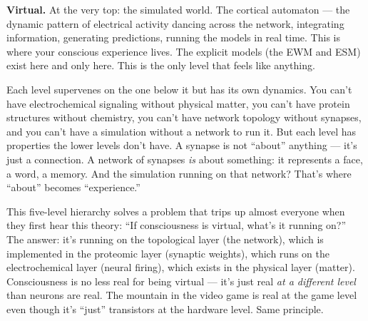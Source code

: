 \documentclass[11pt, twoside, openright]{book}
\begin{document}
\textbf{Virtual.} At the very top: the simulated world. The cortical automaton --- the dynamic pattern of electrical activity dancing across the network, integrating information, generating predictions, running the models in real time. This is where your conscious experience lives. The explicit models (the EWM and ESM) exist here and only here. This is the only level that feels like anything.

Each level supervenes on the one below it but has its own dynamics. You can't have electrochemical signaling without physical matter, you can't have protein structures without chemistry, you can't have network topology without synapses, and you can't have a simulation without a network to run it. But each level has properties the lower levels don't have. A synapse is not ``about'' anything --- it's just a connection. A network of synapses \textit{is} about something: it represents a face, a word, a memory. And the simulation running on that network? That's where ``about'' becomes ``experience.''

This five-level hierarchy solves a problem that trips up almost everyone when they first hear this theory: ``If consciousness is virtual, what's it running on?'' The answer: it's running on the topological layer (the network), which is implemented in the proteomic layer (synaptic weights), which runs on the electrochemical layer (neural firing), which exists in the physical layer (matter). Consciousness is no less real for being virtual --- it's just real \textit{at a different level} than neurons are real. The mountain in the video game is real at the game level even though it's ``just'' transistors at the hardware level. Same principle.
\end{document}
